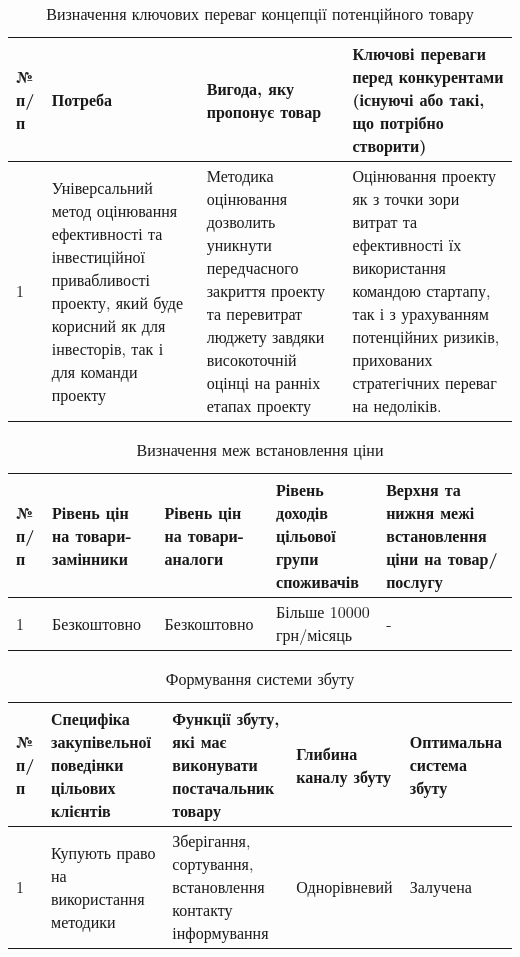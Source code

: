 \begin{table}[h!]
\fontsize{12pt}{12pt}\selectfont
	\begin{tabularx}{\textwidth}{|l|X|X|X|}
    \hline
    № п/п & Потреба & Вигода, яку пропонує товар & Ключові переваги перед конкурентами (існуючі або такі, що потрібно створити) \\ \hline
    1 & Універсальний метод оцінювання ефективності та інвестиційної привабливості проекту, який буде корисний як для інвесторів, так і для команди проекту & Методика оцінювання дозволить уникнути передчасного закриття проекту та перевитрат люджету завдяки високоточній оцінці на ранніх етапах проекту & Оцінювання проекту як з точки зори витрат та ефективності їх використання командою стартапу, так і з урахуванням потенційних ризиків, прихованих стратегічних переваг на недоліків. \\
    \hline
    \end{tabularx}
\caption{Визначення ключових переваг концепції потенційного товару} \label{tab:stab_13}
\end{table}

\begin{table}[h!]
\fontsize{12pt}{12pt}\selectfont
	\begin{tabularx}{\textwidth}{|l|X|X|X|X|}
    \hline
    № п/п & Рівень цін на товари-замінники & Рівень цін на товари-аналоги & Рівень доходів цільової групи споживачів & Верхня та нижня межі встановлення ціни на товар/послугу \\ \hline
    1 & Безкоштовно & Безкоштовно & Більше 10000 грн/місяць & - \\
    \hline
    \end{tabularx}
\caption{Визначення меж встановлення ціни} \label{tab:stab_14}
\end{table}

\begin{table}[h!]
\fontsize{12pt}{12pt}\selectfont
	\begin{tabularx}{\textwidth}{|l|X|X|X|X|}
    \hline
    № п/п & Специфіка закупівельної поведінки цільових клієнтів & Функції збуту, які має виконувати постачальник товару & Глибина каналу збуту & Оптимальна система збуту \\ \hline
    1 & Купують право на використання методики & Зберігання, сортування, встановлення контакту інформування & Однорівневий & Залучена \\
    \hline
    \end{tabularx}
\caption{Формування системи збуту} \label{tab:stab_15}
\end{table}

